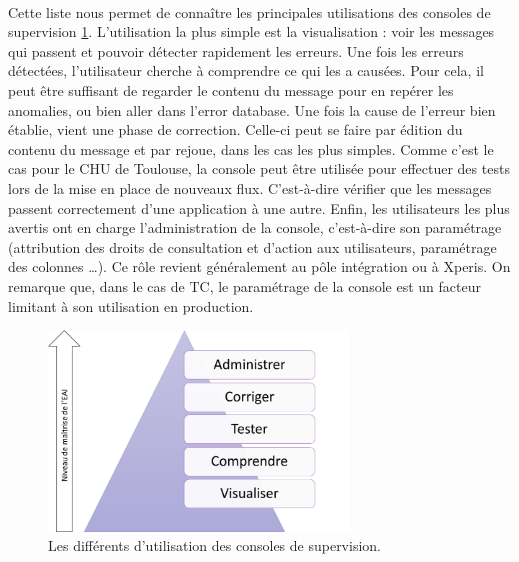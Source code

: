 			\paragraph{}
			Cette liste nous permet de connaître les principales utilisations des
			consoles de supervision \ref{Figure x}. L’utilisation la plus simple est la
			visualisation : voir les messages qui passent et pouvoir détecter rapidement
			les erreurs. Une fois les erreurs détectées, l’utilisateur cherche à
			comprendre ce qui les a causées. Pour cela, il peut être suffisant de
			regarder le contenu du message pour en repérer les anomalies, ou bien aller
			dans l’error database. Une fois la cause de l’erreur bien établie, vient une
			phase de correction. Celle-ci peut se faire par édition du contenu du
			message et par rejoue, dans les cas les plus simples. Comme c’est le cas
			pour le CHU de Toulouse, la console peut être utilisée pour effectuer des
			tests lors de la mise en place de nouveaux flux. C’est-à-dire vérifier que
			les messages passent correctement d’une application à une autre. Enfin, les
			utilisateurs les plus avertis ont en charge l’administration de la console,
			c’est-à-dire son paramétrage (attribution des droits de consultation et
			d’action aux utilisateurs, paramétrage des colonnes …). Ce rôle revient
			généralement au pôle intégration ou à Xperis. On remarque que, dans le cas
			de TC, le paramétrage de la console est un facteur limitant à son
			utilisation en production.
			\begin{figure}[!h]
				\centering
				\includegraphics[width=8cm]{../img/usage_1.png}
				\caption{\label{Figure x} Les différents d'utilisation des consoles de
				supervision.}
			\end{figure}
			
